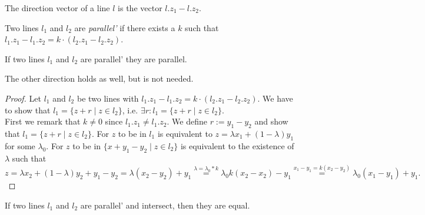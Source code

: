 \begin{definition}
    \label{def:direction_vector}
    \leanok
    The direction vector of a line $l$ is the vector $l.z_1 - l.z_2$.
\end{definition}

\begin{definition}
    \label{def:parallel'}
    \leanok
    Two lines $l_1$ and $l_2$ are \emph{parallel'} if there exists a $k$ such that $l_1.z_1 - l_1.z_2 = k \cdot (l_2.z_1 - l_2.z_2)$.
\end{definition}

\begin{lemma}
    \label{lem:parallel_iff_parallel'}
    \leanok
    If two lines $l_1$ and $l_2$ are parallel' they are parallel.
\end{lemma}
\begin{remark}
    The other direction holds as well, but is not needed.
\end{remark}

\begin{proof}
    \leanok
    Let $l_1$ and $l_2$ be two lines with $l_1.z_1 - l_1.z_2 = k \cdot (l_2.z_1 - l_2.z_2)$.
    We have to show that $l_1 = \{z + r \mid z\in l_2\}$, i.e. $\exists r: l_1 = \{z + r \mid z\in l_2\}$.\\
    First we remark that $k\ne 0$ since $l_1.z_1\ne l_1.z_2$. We define $r:= y_1 - y_2$ and show that $l_1 = \{z + r \mid z\in l_2\}$.
    For $z$ to be in $l_1$ is equivalent to $z = \lambda x_1 + (1-\lambda)y_1$ for some $\lambda_0$. 
    For $z$ to be in $\{x + y_1-y_2 \mid z\in l_2\}$  is equivalent to the existence of $\lambda$ such that 
    $$z = \lambda x_2 + (1-\lambda)y_2 + y_1 - y_2 = \lambda (x_2 - y_2) + y_1 \overset{\lambda = \lambda_0 * k}{=} \lambda_0 k (x_2-x_2)-y_1\overset{x_1-y_1=k(x_2-y_2)}{=}\lambda_0(x_1-y_1)+y_1.$$
\end{proof}

\begin{lemma}
    \label{lem:eq_of_parallel}
    \leanok
    If two lines $l_1$ and $l_2$ are parallel' and intersect, then they are equal.
\end{lemma}

